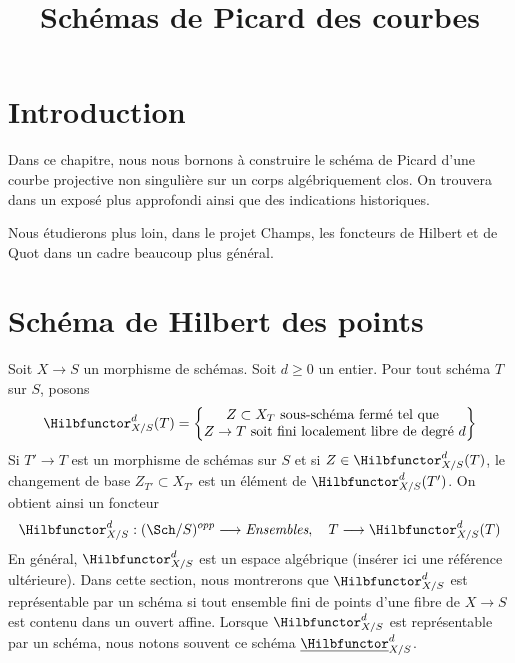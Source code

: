 

%


\title{Schémas de Picard des courbes}


\maketitle

\label{section-phantom}

\tableofcontents


\section{Introduction}
\label{section-introduction}

\noindent
Dans ce chapitre, nous nous bornons à construire le schéma de Picard
d'une courbe projective non singulière sur un corps algébriquement clos.
On trouvera dans \cite{Kleiman-Picard} un exposé plus approfondi ainsi que
des indications historiques.

\medskip\noindent
Nous étudierons plus loin, dans le projet Champs, les foncteurs de Hilbert et de Quot
dans un cadre beaucoup plus général.


\section{Schéma de Hilbert des points}
\label{section-hilbert-scheme-points}

\noindent
Soit $X \to S$ un morphisme de schémas. Soit $d \geq 0$ un entier.
Pour tout schéma $T$ sur $S$, posons
$$
\Hilbfunctor^d_{X/S}(T) =
\left\{
\begin{matrix}
Z \subset X_T\text{ sous-schéma fermé tel que }\\
Z \to T\text{ soit fini localement libre de degré }d
\end{matrix}
\right\}
$$
Si $T' \to T$ est un morphisme de schémas sur $S$ et si
$Z \in \Hilbfunctor^d_{X/S}(T)$, le changement de base
$Z_{T'} \subset X_{T'}$ est un élément de $\Hilbfunctor^d_{X/S}(T')$.
On obtient ainsi un foncteur
$$
\Hilbfunctor^d_{X/S} :
(\Sch/S)^{opp} \longrightarrow \textit{Ensembles},\quad
T \longrightarrow \Hilbfunctor^d_{X/S}(T)
$$
En général, $\Hilbfunctor^d_{X/S}$ est un espace algébrique
(insérer ici une référence ultérieure). Dans cette section, nous
montrerons que $\Hilbfunctor^d_{X/S}$ est représentable
par un schéma si tout ensemble fini de points d'une fibre de
$X \to S$ est contenu dans un ouvert affine.
Lorsque $\Hilbfunctor^d_{X/S}$ est représentable par un schéma, nous
notons souvent ce schéma $\underline{\Hilbfunctor}^d_{X/S}$.

